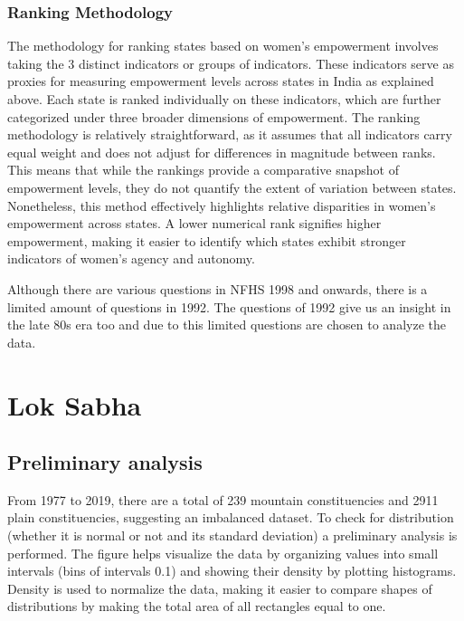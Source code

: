 \subsubsection{Ranking Methodology}
\label{ranking_methodology}
 The methodology for ranking states based on women's empowerment involves taking the 3 distinct indicators or groups of indicators. These indicators serve as proxies for measuring empowerment levels across states in India as explained above. Each state is ranked individually on these indicators, which are further categorized under three broader dimensions of empowerment. The ranking methodology is relatively straightforward, as it assumes that all indicators carry equal weight and does not adjust for differences in magnitude between ranks. This means that while the rankings provide a comparative snapshot of empowerment levels, they do not quantify the extent of variation between states. Nonetheless, this method effectively highlights relative disparities in women's empowerment across states. A lower numerical rank signifies higher empowerment, making it easier to identify which states exhibit stronger indicators of women's agency and autonomy.

\vspace{0.3cm}

Although there are various questions in NFHS 1998 and onwards, there is a limited amount of questions in 1992. The questions of 1992 give us an insight in the late 80s era too and due to this limited questions are chosen to analyze the data.


\section{Lok Sabha}
\subsection{Preliminary analysis}

From 1977 to 2019, there are a total of 239 mountain constituencies and 2911 plain constituencies, suggesting an imbalanced dataset. To check for distribution (whether it is normal or not and its standard deviation) a preliminary analysis is performed. The figure helps visualize the data by organizing values into small intervals (bins of intervals 0.1) and showing their density by plotting histograms. Density is used to normalize the data, making it easier to compare shapes of distributions by making the total area of all rectangles equal to one.


